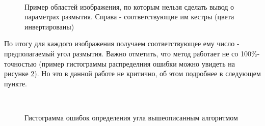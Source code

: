 \begin{figure}[H]
\begin{minipage}[h]{0.4\linewidth}
\end{minipage}
\hfill
\begin{minipage}[h]{0.4\linewidth}
 \\
\end{minipage}

\caption{Пример областей изображения, по которым нельзя сделать вывод о параметрах размытия. Справа - соответствующие им кестры (цвета инвертированы)}
\label{ris:bad_ceps}
\end{figure}

По итогу для каждого изображения получаем соответствующее ему число - предполагаемый угол размытия. Важно отметить, что метод работает не со 100\%-точностью (пример гистограммы распределния ошибки можно увидеть на рисунке \ref{ris:angle_histogram}). Но это в данной работе не критично, об этом подробнее в следующем пункте.

\begin{figure}[H]
 \\ 
\caption{Гистограмма ошибок определения угла вышеописанным алгоритмом}
\label{ris:angle_histogram}
\end{figure}

